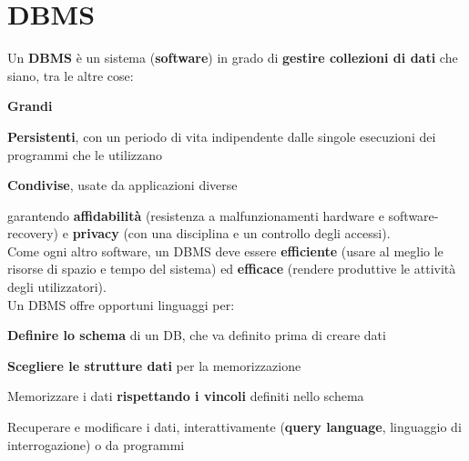 \documentclass[10pt]{book}
\begin{document}
\section{DBMS}
Un \textbf{DBMS} è un sistema (\textbf{software}) in grado di \textbf{gestire collezioni di dati} che siano, tra le altre cose:
\begin{list}{}{}
	\item \textbf{Grandi}
	\item \textbf{Persistenti}, con un periodo di vita indipendente dalle singole esecuzioni dei programmi che le utilizzano
	\item \textbf{Condivise}, usate da applicazioni diverse
\end{list}
garantendo \textbf{affidabilità} (resistenza a malfunzionamenti hardware e software-recovery) e \textbf{privacy} (con una disciplina e un controllo degli accessi).\\
Come ogni altro software, un DBMS deve essere \textbf{efficiente} (usare al meglio le risorse di spazio e tempo del sistema) ed \textbf{efficace} (rendere produttive le attività degli utilizzatori).\\
Un DBMS offre opportuni linguaggi per:
\begin{list}{}{}
	\item \textbf{Definire lo schema} di un DB, che va definito prima di creare dati
	\item \textbf{Scegliere le strutture dati} per la memorizzazione
	\item Memorizzare i dati \textbf{rispettando i vincoli} definiti nello schema
	\item Recuperare e modificare i dati, interattivamente (\textbf{query language}, linguaggio di interrogazione) o da programmi
\end{list}
\end{document}
